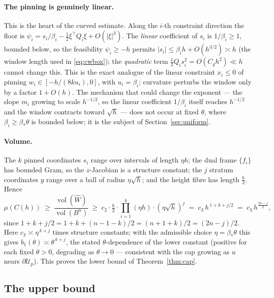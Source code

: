 \documentclass[11pt]{article}
\newcommand{\vol}{\operatorname{vol}}
\begin{document}
\paragraph{The pinning is genuinely linear.}
This is the heart of the curved estimate.  Along the $i$-th constraint
direction the floor is $\psi_i=s_i/\beta_i-\frac12\xi^\top Q_i\xi+O(|\xi|^3)$.
The \emph{linear} coefficient of $s_i$ is $1/\beta_i\ge1$, bounded below, so the
feasibility $\psi_i\ge-h$ permits $|s_i|\le\beta_i h+O(h^{3/2})\asymp h$ (the
window length used in \eqref{eq:cwbox}); the \emph{quadratic} term
$\frac12 Q_i s_i^2=O(C_g h^2)\ll h$ cannot change this.  This is the exact
analogue of the linear constraint $x_i\le0$ of \cite{companion11} pinning
$w_i\in[-h/(8ku_i),0]$, with $u_i=\beta_i$; curvature perturbs the window only by
a factor $1+O(h)$.  The mechanism that could change the exponent --- the slope
$m_i$ growing to scale $h^{-1/2}$, so the linear coefficient $1/\beta_i$ itself
reaches $h^{-1/2}$ and the window contracts toward $\sqrt h$ --- does not occur
at fixed $\theta$, where $\beta_i\ge\beta_*\theta$ is bounded below; it is the
subject of Section~\ref{sec:uniform}.

\paragraph{Volume.}
The $k$ pinned coordinates $s_i$ range over intervals of length $\eta h$; the
dual frame $\{f_i\}$ has bounded Gram, so the $z$-Jacobian is a structure
constant; the $j$ stratum coordinates $y$ range over a ball of radius
$\eta\sqrt h$; and the height fibre has length $\frac h2$.  Hence
\begin{equation}\label{eq:lower}
\mu(C(h))\;\ge\;\frac{\vol(\widehat W)}{\vol(B^n)}
\;\ge\;c_2\cdot \tfrac h2\cdot\prod_{i=1}^k(\eta h)\cdot(\eta\sqrt h)^{j}
\;=\;c_3\,h^{\,1+k+j/2}\;=\;c_3\,h^{\frac{2n-j}2},
\end{equation}
since $1+k+j/2=1+k+(n-1-k)/2=(n+1+k)/2=(2n-j)/2$.  Here $c_3\asymp\eta^{\,k+j}$
times structure constants; with the admissible choice $\eta=\beta_*\theta$ this
gives $b_1(\theta)\asymp\theta^{\,k+j}$, the stated $\theta$-dependence of the
lower constant (positive for each fixed $\theta>0$, degrading as
$\theta\to0$ --- consistent with the cap growing as $u$ nears
$\partial\mathcal U_p$).  This proves the lower bound of Theorem~\ref{thm:cap}.

\subsection{The upper bound}\label{ss:upper}
\end{document}
